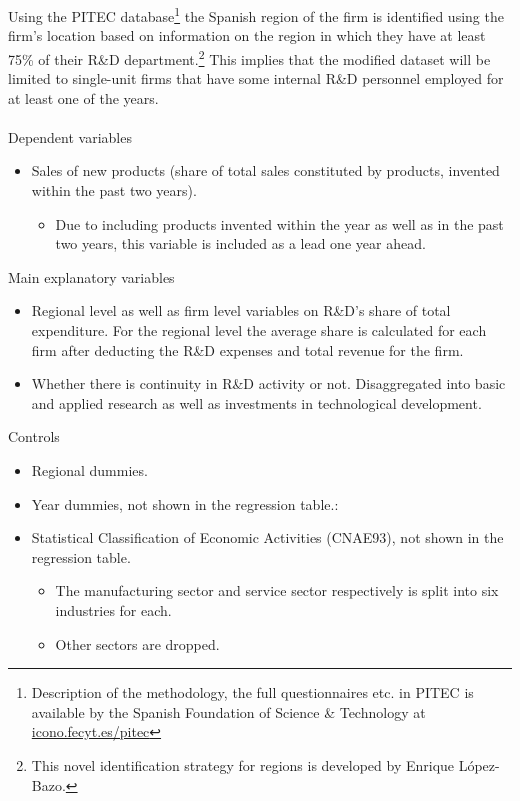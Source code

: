 \label{sec:data}
Using the PITEC database\footnote{Description of the methodology, the full questionnaires etc. in PITEC is available by the Spanish Foundation of Science \& Technology at \href{https://icono.fecyt.es/pitec}{icono.fecyt.es/pitec}} the Spanish region of the firm is identified using the firm's location based on information on the region in which they have at least 75\% of their R\&D department.\footnote{This novel identification strategy for regions is developed by Enrique López-Bazo.} This implies that the modified dataset will be limited to single-unit firms that have some internal R\&D personnel employed for at least one of the years.
\\
\\
Dependent variables
\begin{itemize}
  \item Sales of new products (share of total sales constituted by products, invented within the past two years).
  \begin{itemize}
    \item Due to including products invented within the year as well as in the past two years, this variable is included as a lead one year ahead.
  \end{itemize}
\end{itemize}
Main explanatory variables
\begin{itemize}
  \item Regional level as well as firm level variables on R\&D’s share of total expenditure. For the regional level the average share is calculated for each firm after deducting the R\&D expenses and total revenue for the firm.
  \item Whether there is continuity in R\&D activity or not. Disaggregated into basic and applied research as well as investments in technological development.
\end{itemize}
Controls
\begin{itemize}
  \item Regional dummies.
  \item Year dummies, not shown in the regression table.:
  \item	Statistical Classification of Economic Activities (CNAE93), not shown in the regression table.
  \begin{itemize}
    \item The manufacturing sector and service sector respectively is split into six industries for each.
    \item Other sectors are dropped.
\end{itemize}
\end{itemize}

